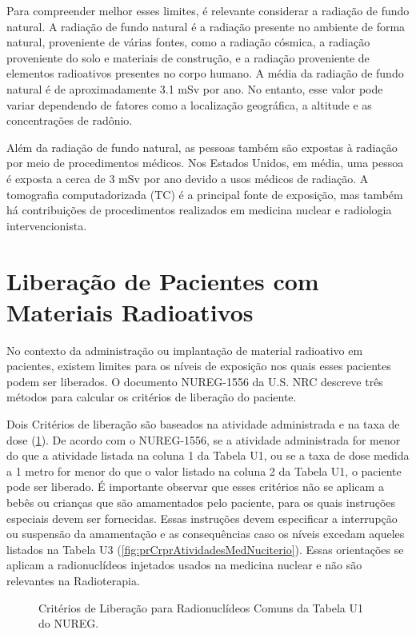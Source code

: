 \documentclass[11pt,a4paper]{article}
\begin{document}
	Para compreender melhor esses limites, é relevante considerar a radiação de fundo natural. A radiação de fundo natural é a radiação presente no ambiente de forma natural, proveniente de várias fontes, como a radiação cósmica, a radiação proveniente do solo e materiais de construção, e a radiação proveniente de elementos radioativos presentes no corpo humano. A média da radiação de fundo natural é de aproximadamente 3.1 mSv por ano. No entanto, esse valor pode variar dependendo de fatores como a localização geográfica, a altitude e as concentrações de radônio.

	Além da radiação de fundo natural, as pessoas também são expostas à radiação por meio de procedimentos médicos. Nos Estados Unidos, em média, uma pessoa é exposta a cerca de 3 mSv por ano devido a usos médicos de radiação. A tomografia computadorizada (TC) é a principal fonte de exposição, mas também há contribuições de procedimentos realizados em medicina nuclear e radiologia intervencionista.


\section{Liberação de Pacientes com Materiais Radioativos}

	No contexto da administração ou implantação de material radioativo em pacientes, existem limites para os níveis de exposição nos quais esses pacientes podem ser liberados. O documento NUREG-1556 da U.S. NRC descreve três métodos para calcular os critérios de liberação do paciente.

	Dois Critérios de liberação são baseados na atividade administrada e na taxa de dose (\ref{fig:prCriterio}). De acordo com o NUREG-1556, se a atividade administrada for menor do que a atividade listada na coluna 1 da Tabela U1, ou se a taxa de dose medida a 1 metro for menor do que o valor listado na coluna 2 da Tabela U1, o paciente pode ser liberado. É importante observar que esses critérios não se aplicam a bebês ou crianças que são amamentados pelo paciente, para os quais instruções especiais devem ser fornecidas.  Essas instruções devem especificar a interrupção ou suspensão da amamentação e as consequências caso os níveis excedam aqueles listados na Tabela U3 (\ref{fig:prCrprAtividadesMedNuciterio}). Essas orientações se aplicam a radionuclídeos injetados usados na medicina nuclear e não são relevantes na Radioterapia.


		\begin{figure}[!h]
			\centering
			\caption{Critérios de Liberação para Radionuclídeos Comuns da Tabela U1 do NUREG.}
			\label{fig:prCriterio}
		\end{figure}
\end{document}
